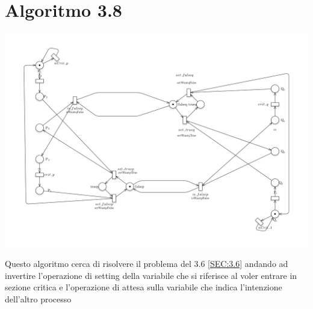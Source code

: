 \documentclass[a4paper]{article}
\begin{document}
\section{Algoritmo 3.8}
\label{SEC:3.8}
\begin{center}\includegraphics[width=1\textwidth]{3.8.png}\end{center}
Questo algoritmo cerca di risolvere il problema del 3.6 \ref{SEC:3.6} andando ad invertire l'operazione di setting della variabile che si riferisce al voler entrare in sezione critica e l'operazione di attesa sulla variabile che indica l'intenzione dell'altro processo
\end{document}
